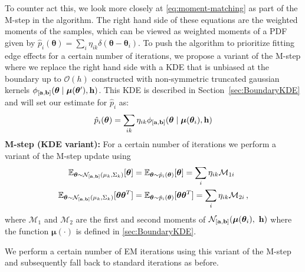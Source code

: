 \documentclass[twocolumn,usenames,dvipsnames,linenumbers]{aastex631}
\newcommand{\btheta}{\boldsymbol{\theta}}
\newcommand{\bmu}{\boldsymbol{\mu}}
\newcommand{\ba}{{\bf a}}
\newcommand{\bb}{{\bf b}}
\begin{document}
To counter act this, we look more closely at \eqref{eq:moment-matching} as part of the M-step in the algorithm.
The right hand side of these equations are the weighted moments of the samples, which can be viewed as weighted moments of a PDF given by $\hat{p}_i(\btheta) = \sum_i \eta_{ik}\delta(\btheta - \btheta_i)$. 
To push the algorithm to prioritize fitting edge effects for a certain number of iterations, we propose a variant of the M-step where we replace the right hand side with a KDE that is unbiased at the boundary up to $\mathcal{O}(h)$ constructed with non-symmetric truncated gaussian kernels $\phi_{[\ba,\bb]}(\btheta \mid \bmu(\btheta'), {\bf h})$. This KDE is described in Section~\ref{sec:BoundaryKDE} and will set our estimate for $\hat{p}_i$ as:
\begin{equation}
	\hat{p}_i(\btheta) = \sum_{ik} \eta_{ik} \phi_{[\ba, \bb]}(\btheta \mid \bmu(\btheta_i), {\bf h})
\end{equation}
\textbf{M-step (KDE variant): }For a certain number of iterations we perform a variant of the M-step update using 
\begin{equation}
	\begin{aligned}
		\mathbb{E}_{\btheta \sim \mathcal{N}_{[\ba,\bb]}(\mu_k, \Sigma_k)}[\btheta] &=  \mathbb{E}_{\btheta \sim \hat{p}_i(\btheta)}[\btheta] = \sum_i \eta_{ik} \mathcal{M}_{1 i} \\
		\mathbb{E}_{\btheta \sim \mathcal{N}_{[\ba,\bb]}(\mu_k, \Sigma_k)}[\btheta\btheta^T] &=  \mathbb{E}_{\btheta \sim \hat{p}_i(\btheta)}[\btheta\btheta^T] = \sum_i \eta_{ik} \mathcal{M}_{2 i}\,,
	\end{aligned}
	\label{eq:moment-matching-updated-kde}
\end{equation}	
where $\mathcal{M}_1$ and $\mathcal{M}_2$ are the first and second moments of $ \mathcal{N}_{[\ba, \bb]}(\bmu(\btheta_i),\ {\bf h})$ where the function $\bmu(\cdot)$ is defined in \ref{sec:BoundaryKDE}.

We perform a certain number of EM iterations using this variant of the M-step and subsequently fall back to standard iterations as before.  
\end{document}
